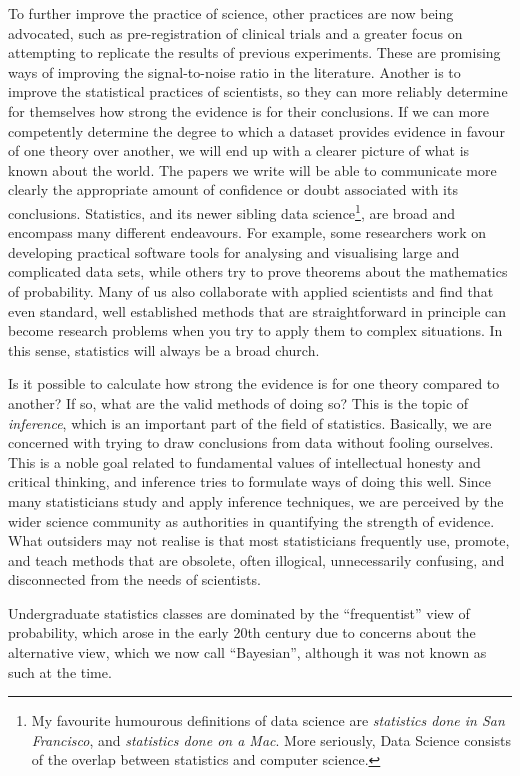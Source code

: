 \documentclass[a4paper, 12pt]{article}
\begin{document}
To further improve the practice of science, other practices are now being
advocated, such as pre-registration of clinical trials and
a greater focus on attempting to replicate the results of previous
experiments. These are promising ways of improving the signal-to-noise
ratio in the literature. Another is to improve the statistical
practices of scientists, so they can more reliably determine for themselves
how strong the
evidence is for their conclusions. If we can more competently determine
the degree to which a dataset provides evidence in favour of one theory over
another, we will end up with a clearer picture of what is known about the
world. The papers we write will be able to communicate more clearly the
appropriate amount of confidence or doubt associated with its conclusions.
Statistics, and its newer sibling data science\footnote{My favourite
humourous definitions of data science are
{\em statistics done in San Francisco}, and {\em statistics done on a Mac}.
More seriously, Data Science consists of the overlap between statistics and
computer science.},
are broad and encompass many different endeavours. For example, some researchers
work on developing practical software tools for analysing and visualising large and
complicated data sets, while others try to prove theorems about the mathematics
of probability. Many of us also collaborate with applied scientists and find
that even standard, well established methods that are straightforward in
principle can become research problems when you try to apply them to complex
situations. In this sense, statistics will always be a broad church.

Is it possible to calculate how strong the evidence is for one theory compared
to another? If so, what are the valid methods of doing so? This is the topic
of {\em inference}, which is an important part of the field of statistics.
Basically, we are concerned with trying to
draw conclusions from data without fooling ourselves. This is a noble goal
related to fundamental values of intellectual honesty and critical
thinking, and inference tries to formulate ways of doing this well.
Since many statisticians study and apply inference techniques,
we are perceived by the wider science community as authorities
in quantifying the strength of evidence. What outsiders may not realise is
that most statisticians frequently use, promote, and teach methods that are
obsolete, often illogical, unnecessarily confusing, and disconnected from the
needs of scientists.

Undergraduate statistics classes are dominated by the ``frequentist'' view
of probability, which arose in the early 20th century due to concerns about the
alternative view, which we now call ``Bayesian'', although it was not known as
such at the time.
\end{document}
